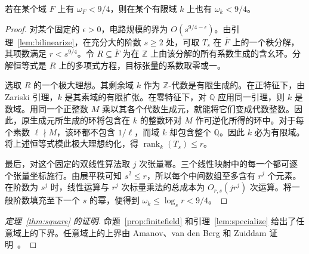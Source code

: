 \begin{lemma}[特化到有限域]\label{lem:specialize}
若在某个域 \(F\) 上有 \(\omega_F<9/4\)，则在某个有限域 \(k\) 上也有 \(\omega_k<9/4\)。
\end{lemma}
\begin{proof}
对某个固定的 \(\epsilon>0\)，电路规模的界为 \(O(s^{9/4-\epsilon})\)。由引理~\ref{lem:bilinearize}，在充分大的阶数 \(s\ge2\) 处，可取 \(T_s\) 在 \(\overline F\) 上的一个秩分解，其项数满足 \(r<s^{9/4}\)。令 \(R\subseteq\overline F\) 为在 \(\mathbb Z\) 上由该分解的所有系数生成的含幺环。分解恒等式是 \(R\) 上的多项式方程，目标张量的系数取零或一。

选取 \(R\) 的一个极大理想。其剩余域 \(k\) 作为 \(\mathbb Z\)-代数是有限生成的。在正特征下，由 Zariski 引理，\(k\) 是其素域的有限扩张。在零特征下，对 \(\mathbb Q\) 应用同一引理，则 \(k\) 是数域。用同一个正整数 \(M\) 乘以其各个代数生成元，就能将它们变成代数整数。因此，原生成元所生成的环将包含在 \(k\) 的整数环对 \(M\) 作可逆化所得的环中。对于每个素数 \(\ell\nmid M\)，该环都不包含 \(1/\ell\)，而域 \(k\) 却包含整个 \(\mathbb Q\)。因此 \(k\) 必为有限域。将上述恒等式模此极大理想约化，得 \(\operatorname{rank}_k(T_s)\le r\)。

最后，对这个固定的双线性算法取 \(j\) 次张量幂。三个线性映射中的每一个都可逐个张量坐标施行。由展平秩可知 \(s^2\le r\)，所以每个中间数组至多含有 \(r^j\) 个元素。在阶数为 \(s^j\) 时，线性运算与 \(r^j\) 次标量乘法的总成本为 \(O_{r,s}(j r^j)\) 次运算。将一般阶数填充至下一个 \(s\) 的幂，便得到 \(\omega_k\le\log_s r<9/4\)。
\end{proof}

\begin{proof}[定理~\ref{thm:square} 的证明]
命题~\ref{prop:finitefield} 和引理~\ref{lem:specialize} 给出了任意域上的下界。任意域上的上界由 Amanov、van den Berg 和 Zuiddam 证明~\citep{abvz}。
\end{proof}
